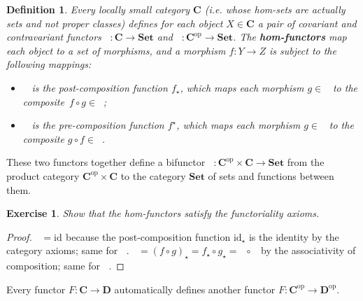 \documentclass[a5paper,oneside,11pt]{article}
\newtheorem{ex}{Exercise}
\newtheorem{defn}{Definition}
\newcommand\id{\mathord{\mathrm{id}}}
\newcommand\1{\mathord{\mathrm{1}}}
\newcommand\cat[1]{\mathbf{#1}}
\newcommand\op{\mathrm{op}}
\newcommand\Hom[3]{\mathop{\mathsf{Hom}_{\cat{#1}}(#2, #3)}}
\begin{document}
\begin{defn}
\label{defn:hom}
Every locally small category $\cat{C}$ (i.e. whose hom-sets are actually sets and not proper
classes) defines for each object $X \in \cat{C}$ a pair of covariant and contravariant
functors $\Hom{C}{X}{-} : \cat{C} \longrightarrow \cat{Set}$ and
$\Hom{C}{-}{X} : \cat{C}^{\op} \longrightarrow \cat{Set}$.
The \textbf{hom-functors} map each object to a set of morphisms, and a morphism
$f : Y \rightarrow Z$ is subject to the following mappings:
\begin{itemize}
    \item $\Hom{C}{X}{f}$ is the post-composition function $f_\star$, which
        maps each morphism $g \in \Hom{C}{X}{Y}$ to the composite~$f \circ g \in \Hom{C}{X}{Z}$;
    \item $\Hom{C}{f}{X}$ is the pre-composition function $f^\star$, which
        maps each morphism $g \in \Hom{C}{Z}{X}$ to the composite
        $g \circ f \in \Hom{C}{Y}{X}$.
\end{itemize}
\end{defn}
These two functors together define a bifunctor $\Hom{C}{-}{-} : \cat{C}^\op \times \cat{C}
\longrightarrow \cat{Set}$ from the product category $\cat{C}^\op \times \cat{C}$ to
the category $\cat{Set}$ of sets and functions between them.

\begin{ex}
    Show that the hom-functors satisfy the functoriality axioms.
\end{ex}
\begin{proof}
        $\Hom{C}{X}{\id_Y} = \id_{\Hom{C}{X}{Y}}$ because the post-composition
            function $\id_\star$ is the identity by the category axioms; same
            for $\Hom{C}{\id_Y}{X}$.
        $\Hom{C}{X}{f \circ g} = (f \circ g)_\star = f_\star \circ g_\star =
            \Hom{C}{X}{f} \circ \Hom{C}{X}{g}$ by the associativity of composition;
            same for $\Hom{C}{f \circ g}{X}$.
\end{proof}

Every functor $F : \cat{C} \longrightarrow \cat{D}$ automatically defines another functor
$F : \cat{C}^\op \longrightarrow \cat{D}^\op$.
\end{document}
